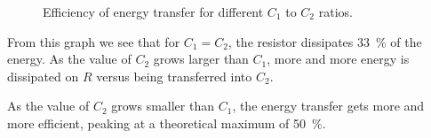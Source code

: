 \begin{figure}[t]
    \centering
    
    \caption{Efficiency of energy transfer for different $C_1$ to $C_2$ ratios.}
    \label{fig:transfer-efficiency}
\end{figure}

From  this  graph  we  see   that   for  $C_1=C_2$,  the  resistor  dissipates
\SI{33}{\percent} of the energy. As the  value  of  $C_2$  grows  larger  than
$C_1$, more and more energy is dissipated on $R$ versus being transferred into
$C_2$.

As the value of $C_2$ grows smaller  than $C_1$, the energy transfer gets more
and  more  efficient, peaking at a theoretical maximum  of  \SI{50}{\percent}.

